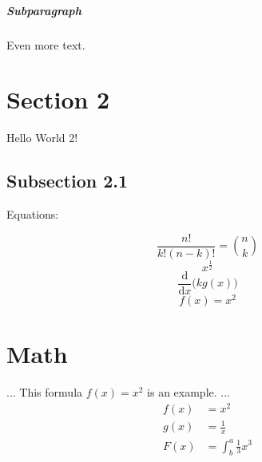 \documentclass{article}
\begin{document}
    \subparagraph{Subparagraph}
    Even more text.

    \section{Section 2}
    Hello World 2!

    \subsection{Subsection 2.1}
    Equations:
    
        \begin{equation}
            \frac{n!}{k!(n-k)!} = \binom{n}{k}  
        \end{equation}
        \begin{equation}
            x^\frac{1}{2}  
        \end{equation}
        \begin{equation}
            \frac{\mathrm d}{\mathrm d x} \big( k g(x) \big)
        \end{equation}
        \begin{equation*}
            f(x) = x^2
        \end{equation*}
    
    \section{Math}
    ...
    This formula $f(x) = x^2$ is an example.
    ...
    \begin{align*}
        f(x) &= x^2\\
        g(x) &= \frac{1}{x}\\
        F(x) &= \int^a_b \frac{1}{3}x^3
      \end{align*}
    
\end{document}
